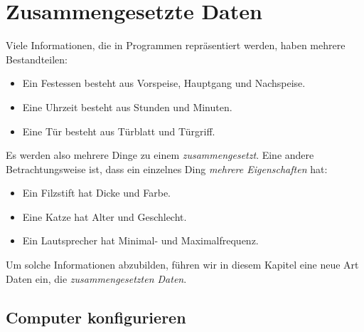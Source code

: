 
\chapter{Zusammengesetzte Daten}
\label{cha:zusammengesetzte-daten}

Viele Informationen, die in Programmen repräsentiert werden, haben
mehrere Bestandteilen:
%
\begin{itemize}
\item Ein Festessen besteht aus Vorspeise, Hauptgang und Nachspeise.
\item Eine Uhrzeit besteht aus Stunden und Minuten.
\item Eine Tür besteht aus Türblatt und Türgriff.
\end{itemize}
%
Es werden also mehrere Dinge zu einem \textit{zusammengesetzt}.
Eine andere Betrachtungsweise ist, dass ein einzelnes
Ding \textit{mehrere Eigenschaften} hat:
%
\begin{itemize}
\item Ein Filzstift hat Dicke und Farbe.
\item Eine Katze hat Alter und Geschlecht.
\item Ein Lautsprecher hat Minimal- und Maximalfrequenz.
\end{itemize}
%
Um solche Informationen abzubilden, führen wir in diesem Kapitel eine neue Art
Daten ein, die \textit{zusammengesetzten
  Daten}.

\section{Computer konfigurieren}
\label{sec:computer-konfigurieren}

